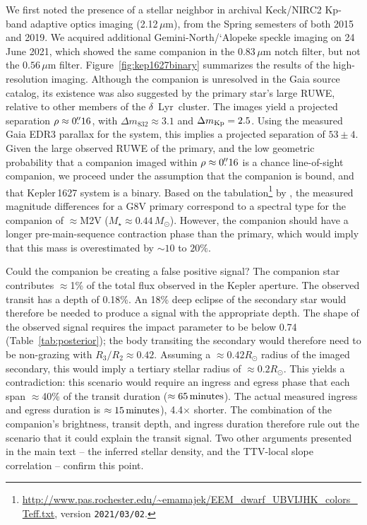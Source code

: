 \documentclass[12pt,modern,twocolumn,tighten]{aastex63}
\newcommand{\cn}{$\delta$\ Lyr\ cluster} %
\begin{document}
We first noted the presence of a stellar neighbor in archival
Keck/NIRC2 Kp-band adaptive optics imaging (2.12\,$\mu $m), from the
Spring semesters of both 2015 and 2019.  We acquired additional
Gemini-North/`Alopeke speckle imaging on 24 June 2021, which showed
the same companion in the 0.83\,$\mu$m notch filter, but not the
$0.56\,\mu$m filter.  Figure~\ref{fig:kep1627binary} summarizes the
results of the high-resolution imaging.  Although the companion is
unresolved in the Gaia source catalog, its existence was also
suggested by the primary star's large RUWE, relative to other members
of the \cn.  The images yield a projected separation $\rho \approx
0\mbox{$.\!\!^{\prime\prime}$}16$, with $\Delta m_{832} \approx 3.1$ and $\Delta m_{\rm Kp} =
2.5$.  Using the measured Gaia EDR3 parallax for the system, this
implies a projected separation of $53 \pm 4$.  Given the large
observed RUWE of the primary, and the low geometric probability that a
companion imaged within $\rho \approx 0\mbox{$.\!\!^{\prime\prime}$}16$ is a chance
line-of-sight companion, we proceed under the assumption that the
companion is bound, and that Kepler\,1627 system is a binary.  Based
on the
tabulation\footnote{\url{http://www.pas.rochester.edu/~emamajek/EEM_dwarf_UBVIJHK_colors_Teff.txt},
version \texttt{2021/03/02}.} by \citet{pecaut_mamajek_2013}, the
measured magnitude differences for a G8V primary correspond to a
spectral type for the companion of $\approx$M2V ($M_\star \approx
0.44\,M_\odot$).  However, the companion should have a longer
pre-main-sequence contraction phase than the primary, which would
imply that this mass is overestimated by $\sim10$ to $20\%$.

Could the companion be creating a false positive signal?  The
companion star contributes $\approx$1\% of the total flux observed in
the Kepler aperture.  The observed transit has a depth of 0.18\%.  An
18\% deep eclipse of the secondary star would therefore be needed to
produce a signal with the appropriate depth.  The shape of the
observed signal requires the impact parameter to be below 0.74
(Table~\ref{tab:posterior}); the body transiting the secondary would
therefore need to be non-grazing with $R_3/R_2 \approx 0.42$.
Assuming a $\approx 0.42R_\odot$ radius of the imaged secondary, this
would imply a tertiary stellar radius of $\approx 0.2R_\odot$.  This
yields a contradiction:  this scenario would require an ingress and
egress phase that each span $\approx$40\% of the transit duration
($\approx 65\,{\rm minutes}$).  The actual measured ingress and egress
duration is $\approx 15\,{\rm minutes}$), 4.4$\times$ shorter.  The
combination of the companion's brightness, transit depth, and ingress
duration therefore rule out the scenario that it could explain the
transit signal.
Two other arguments presented in the main text -- the inferred stellar
density, and the TTV-local slope correlation -- confirm this point.
\end{document}

